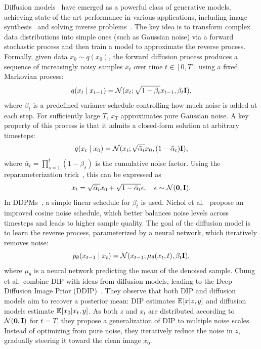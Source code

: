 Diffusion models~\cite{Diffusion} have emerged as a powerful class of generative models, achieving state-of-the-art performance in various applications, including image synthesis~\cite{LDM} and solving inverse problems~\cite{DDRM}.
The key idea is to transform complex data distributions into simple ones (such as Gaussian noise) via a forward stochastic process and then train a model to approximate the reverse process.
Formally, given data $x_0 \sim q(x_0)$, the forward diffusion process produces a sequence of increasingly noisy samples $x_t$ over time $t \in [0,T]$ using a fixed Markovian process:
\begin{equation}
    q(x_t \mid x_{t-1}) = \mathcal{N}(x_t;\sqrt{1 - \beta_t} x_{t-1},\beta_t \mathbf{I}),
\end{equation}
where $\beta_t$ is a predefined variance schedule controlling how much noise is added at each step. For sufficiently large $T$, $x_T$ approximates pure Gaussian noise.
A key property of this process is that it admits a closed-form solution at arbitrary timesteps:
\begin{equation}
    q(x_t \mid x_0) = \mathcal{N}(x_t;\sqrt{\bar{\alpha}_t} x_0,(1-\bar{\alpha}_t) \mathbf{I}),
\end{equation}
where $\bar{\alpha}_t = \prod_{s=1}^{t} (1 - \beta_s)$ is the cumulative noise factor.
Using the reparameterization trick~\cite{VAE}, this can be expressed as
\begin{equation}
    x_t = \sqrt{\bar{\alpha}_t}x_0 + \sqrt{1-\bar{\alpha}_t}\epsilon, \quad \epsilon \sim \mathcal{N}(\mathbf{0},\mathbf{I}).
\end{equation}
In DDPMs~\cite{DDPM}, a simple linear schedule for $\beta_t$ is used. Nichol et al.~\cite{IDDPM} propose an improved cosine noise schedule, which better balances noise levels across timesteps and leads to higher sample quality.
The goal of the diffusion model is to learn the reverse process, parameterized by a neural network, which iteratively removes noise:
\begin{equation}
    p_\theta(x_{t-1} \mid x_t) = \mathcal{N}(x_{t-1};\mu_\theta(x_t, t),\beta_t \mathbf{I}),
\end{equation}
where $\mu_\theta$ is a neural network predicting the mean of the denoised sample.
\newpage
Chung et al.\ combine DIP with ideas from diffusion models, leading to the Deep Diffusion Image Prior (DDIP)~\cite{DDIP}.
They observe that both DIP and diffusion models aim to recover a posterior mean:
DIP estimates $\mathbb{E}_{ } [x | z,y]$ and diffusion models estimate $\mathbb{E}_{ } [x_0 | x_t,y]$.
As both $z$ and $x_t$ are distributed according to $\mathcal{N}(\mathbf{0},\mathbf{I})$ for $t=T$, they propose a generalization of DIP to multiple noise scales. Instead of optimizing from pure noise, they iteratively reduce the noise in $z$, gradually steering it toward the clean image $x_0$.
